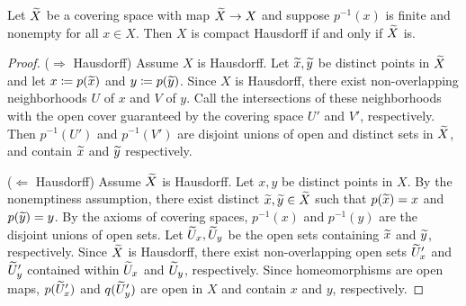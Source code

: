 \documentclass[a5paper]{article}
\begin{document}
\begin{proposition*}
	Let $\widetilde{X}$ be a covering space with map $\widetilde{X}\to X$ and suppose
  $p^{-1}(x)$ is finite and nonempty for all $x\in X$. Then $X$ is compact
  Hausdorff if and only if $\widetilde{X}$ is.
\end{proposition*}
\begin{proof}
	($\Rightarrow$ Hausdorff) Assume $X$ is Hausdorff. Let $\widetilde{x},\widetilde{y}$ be
  distinct points in $\widetilde{X}$ and let $x\coloneqq p(\widetilde{x})$
  and $y\coloneqq p(\widetilde{y})$. Since $X$ is Hausdorff, there exist non-overlapping
  neighborhoods $U$ of $x$ and $V$ of $y$. Call the intersections of these
  neighborhoods with the open cover guaranteed by the covering space $U'$ and
  $V'$, respectively. Then $p^{-1}(U')$ and $p^{-1}(V')$ are disjoint unions of
  open and distinct sets in $\widetilde{X}$, and contain $\widetilde{x}$ and $\widetilde{y}$
  respectively.

	($\Leftarrow$ Hausdorff) Assume $\widetilde{X}$ is Hausdorff. Let $x,y$ be
  distinct points in $X$. By the nonemptiness assumption, there exist
  distinct $\widetilde{x},\widetilde{y}\in\widetilde{X}$ such that $p(\widetilde{x})=x$ and $p(\widetilde{y})=y$.
  By the axioms of covering spaces, $p^{-1}(x)$ and $p^{-1}(y)$ are the disjoint
  unions of open sets. Let $\widetilde{U}_x,\widetilde{U}_y$ be the open sets containing
  $\widetilde{x}$ and $\widetilde{y}$, respectively. Since $\widetilde{X}$ is Hausdorff, there exist
  non-overlapping open sets $\widetilde{U}_x'$ and $\widetilde{U}_y'$ contained within
  $\widetilde{U}_x$ and $\widetilde{U}_y$, respectively. Since homeomorphisms are open maps,
  $p(\widetilde{U}_x')$ and $q(\widetilde{U}_y')$ are open in $X$ and contain $x$ and $y$,
  respectively. 
\end{proof}
\end{document}
